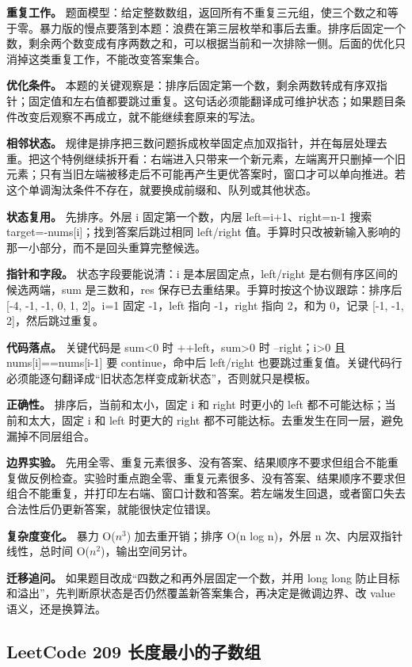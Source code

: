\textbf{重复工作。} 题面模型：给定整数数组，返回所有不重复三元组，使三个数之和等于零。暴力版的慢点要落到本题：浪费在第三层枚举和事后去重。排序后固定一个数，剩余两个数变成有序两数之和，可以根据当前和一次排除一侧。后面的优化只消掉这类重复工作，不能改变答案集合。

\textbf{优化条件。} 本题的关键观察是：排序后固定第一个数，剩余两数转成有序双指针；固定值和左右值都要跳过重复。这句话必须能翻译成可维护状态；如果题目条件改变后观察不再成立，就不能继续套原来的写法。

\textbf{相邻状态。} 规律是排序把三数问题拆成枚举固定点加双指针，并在每层处理去重。把这个特例继续拆开看：右端进入只带来一个新元素，左端离开只删掉一个旧元素；只有当旧左端被移走后不可能再产生更优答案时，窗口才可以单向推进。若这个单调淘汰条件不存在，就要换成前缀和、队列或其他状态。

\textbf{状态复用。} 先排序。外层 i 固定第一个数，内层 left=i+1、right=n-1 搜索 target=-nums[i]；找到答案后跳过相同 left/right 值。手算时只改被新输入影响的那一小部分，而不是回头重算完整候选。

\textbf{指针和字段。} 状态字段要能说清：i 是本层固定点，left/right 是右侧有序区间的候选两端，sum 是三数和，res 保存已去重结果。手算时按这个协议跟踪：排序后 [-4, -1, -1, 0, 1, 2]。i=1 固定 -1，left 指向 -1，right 指向 2，和为 0，记录 [-1, -1, 2]，然后跳过重复。

\textbf{代码落点。} 关键代码是 sum<0 时 ++left，sum>0 时 --right；i>0 且 nums[i]==nums[i-1] 要 continue，命中后 left/right 也要跳过重复值。关键代码行必须能逐句翻译成“旧状态怎样变成新状态”，否则就只是模板。

\textbf{正确性。} 排序后，当前和太小，固定 i 和 right 时更小的 left 都不可能达标；当前和太大，固定 i 和 left 时更大的 right 都不可能达标。去重发生在同一层，避免漏掉不同层组合。

\textbf{边界实验。} 先用全零、重复元素很多、没有答案、结果顺序不要求但组合不能重复做反例检查。实验时重点跑全零、重复元素很多、没有答案、结果顺序不要求但组合不能重复，并打印左右端、窗口计数和答案。若左端发生回退，或者窗口失去合法性后仍更新答案，就能很快定位错误。

\textbf{复杂度变化。} 暴力 O(\ensuremath{n^{3}}) 加去重开销；排序 O(n log n)，外层 n 次、内层双指针线性，总时间 O(\ensuremath{n^{2}})，输出空间另计。

\textbf{迁移追问。} 如果题目改成“四数之和再外层固定一个数，并用 long long 防止目标和溢出”，先判断原状态是否仍然覆盖新答案集合，再决定是微调边界、改 value 语义，还是换算法。

\subsection{LeetCode 209 长度最小的子数组}

